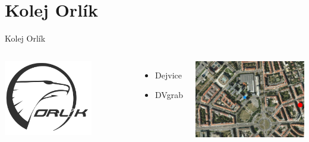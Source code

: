 \documentclass{beamer}
\begin{document}
\section{Kolej Orlík}
\begin{frame}{Kolej Orlík}
	\begin{columns}[c]
			\begin{center}
				\includegraphics[width=0.7\textwidth]{logo_ok.png}
			\end{center}

			\begin{itemize}
				\item Dejvice
				\item DVgrab
			\end{itemize}
			\begin{center}
				\includegraphics[width=\textwidth]{mapa_ok.png}
			\end{center}
	\end{columns}

\end{frame}
\end{document}
